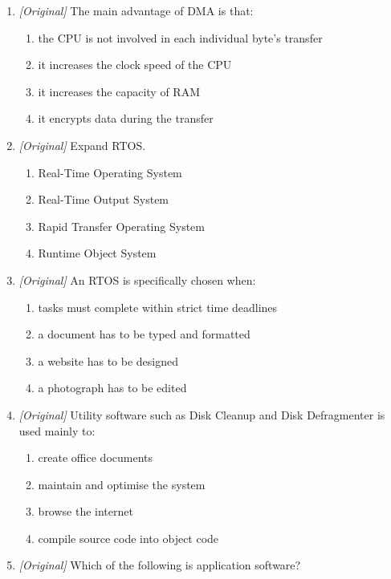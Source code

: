 \documentclass[11pt]{article}
\begin{document}
\begin{enumerate}[label=\textbf{Q\arabic*.}, leftmargin=*]
\begin{enumerate}[label=\Alph*.]
    \item secondary storage and the CPU
  \end{enumerate}
\item \textit{[Original]} The main advantage of DMA is that:
  \begin{enumerate}[label=\Alph*.]
    \item the CPU is not involved in each individual byte's transfer
    \item it increases the clock speed of the CPU
    \item it increases the capacity of RAM
    \item it encrypts data during the transfer
  \end{enumerate}
\item \textit{[Original]} Expand RTOS.
  \begin{enumerate}[label=\Alph*.]
    \item Real-Time Operating System
    \item Real-Time Output System
    \item Rapid Transfer Operating System
    \item Runtime Object System
  \end{enumerate}
\item \textit{[Original]} An RTOS is specifically chosen when:
  \begin{enumerate}[label=\Alph*.]
    \item tasks must complete within strict time deadlines
    \item a document has to be typed and formatted
    \item a website has to be designed
    \item a photograph has to be edited
  \end{enumerate}
\item \textit{[Original]} Utility software such as Disk Cleanup and Disk
  Defragmenter is used mainly to:
  \begin{enumerate}[label=\Alph*.]
    \item create office documents
    \item maintain and optimise the system
    \item browse the internet
    \item compile source code into object code
  \end{enumerate}
\item \textit{[Original]} Which of the following is application software?
  \begin{enumerate}[label=\Alph*.]

\end{enumerate}
\end{enumerate}
\end{document}
